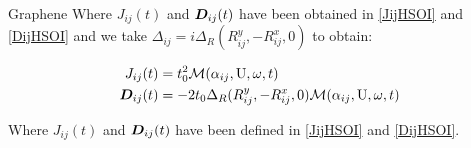\begin{section}{Graphene}
Where $J_{ij}(t)$ and $\boldsymbol{D}_{ij}(t)$ have been obtained in \ref{JijHSOI} and \ref{DijHSOI} and we take $\Delta_{ij} = i\Delta_R (R_{ij}^y, - R_{ij}^x, 0)$ to obtain:

\begin{align*}
J_{ij}(t) &= t_0^2\mathcal{M}(\alpha_{ij}, \text{U}, \omega, t) \\
\boldsymbol{D}_{ij}(t) &= -2t_0\Delta_R (R_{ij}^y, - R_{ij}^x, 0) \mathcal{M}(\alpha_{ij}, \text{U}, \omega, t)
\end{align*}

Where $J_{ij}(t)$ and $\boldsymbol{D}_{ij}(t)$ have been defined in \ref{JijHSOI} and \ref{DijHSOI}. 

\end{section}
